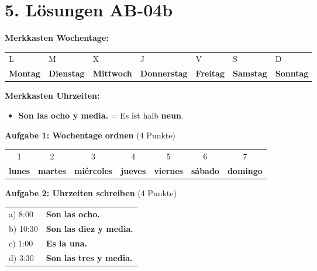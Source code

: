 \documentclass[11pt, a4paper]{article}
\newcommand{\fachfarbe}{spanisch}
\newcommand{\sequenz}{04}
\newcommand{\block}{b}
\newcommand{\loesung}[1]{\textcolor{loesung}{\textbf{#1}}}
\newcommand{\es}[1]{\textcolor{\fachfarbe}{\textbf{#1}}}
\begin{document}

\section*{5. Lösungen AB-\sequenz\block}

\textbf{Merkkasten Wochentage:}

\begin{tabular}{lllllll}
L & M & X & J & V & S & D \\
\loesung{Montag} & \loesung{Dienstag} & \loesung{Mittwoch} & \loesung{Donnerstag} & \loesung{Freitag} & \loesung{Samstag} & \loesung{Sonntag} \\
\end{tabular}

\vspace{0.5em}

\textbf{Merkkasten Uhrzeiten:}
\begin{itemize}
    \item \es{Son las ocho y media.} = Es ist halb \loesung{neun}.
\end{itemize}

\vspace{1em}

\textbf{Aufgabe 1: Wochentage ordnen} (4 Punkte)

\begin{tabular}{ccccccc}
1 & 2 & 3 & 4 & 5 & 6 & 7 \\
\loesung{lunes} & \loesung{martes} & \loesung{miércoles} & \loesung{jueves} & \loesung{viernes} & \loesung{sábado} & \loesung{domingo} \\
\end{tabular}

\vspace{1em}

\textbf{Aufgabe 2: Uhrzeiten schreiben} (4 Punkte)

\begin{tabular}{ll}
a) 8:00 & \loesung{Son las ocho.} \\
b) 10:30 & \loesung{Son las diez y media.} \\
c) 1:00 & \loesung{Es la una.} \\
d) 3:30 & \loesung{Son las tres y media.} \\
\end{tabular}

\vspace{1em}
\end{document}
